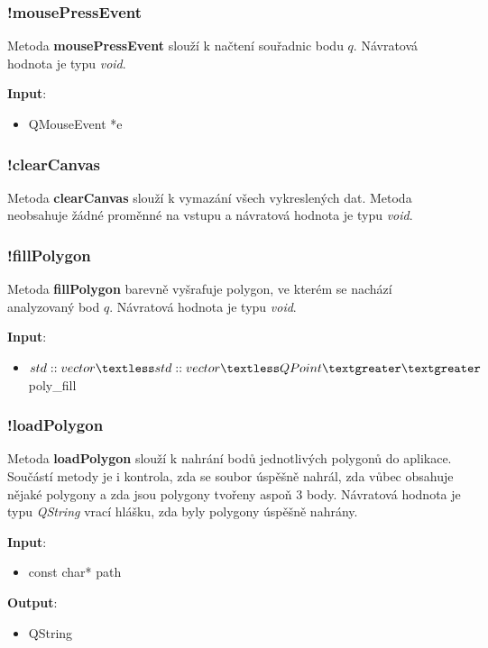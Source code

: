 \documentclass[a4paper, 12pt]{article}
\begin{document}
\subsubsection{!mousePressEvent}
Metoda \textbf{mousePressEvent} slouží k načtení souřadnic bodu $q$. Návratová hodnota je typu \textsl{void}.

\textbf{Input}:
\begin{itemize}
\item QMouseEvent *e
\end{itemize}

\subsubsection{!clearCanvas}
Metoda \textbf{clearCanvas} slouží k vymazání všech vykreslených dat. Metoda neobsahuje žádné proměnné na vstupu a návratová hodnota je typu \textsl{void}.

\subsubsection{!fillPolygon}
Metoda \textbf{fillPolygon} barevně vyšrafuje polygon, ve kterém se nachází analyzovaný bod $q$. Návratová hodnota je typu \textsl{void}.

\textbf{Input}:
\begin{itemize}
\item $std::vector\textless std::vector\textless QPoint\textgreater \textgreater$ poly\_fill
\end{itemize}

\subsubsection{!loadPolygon}
Metoda \textbf{loadPolygon} slouží k nahrání bodů jednotlivých polygonů do aplikace.  Součástí metody je i kontrola, zda se soubor úspěšně nahrál, zda vůbec obsahuje nějaké polygony a zda jsou polygony tvořeny aspoň 3 body. Návratová hodnota je typu \textsl{QString} vrací hlášku, zda byly polygony úspěšně nahrány.

\textbf{Input}:
\begin{itemize}
\item const char* path
\end{itemize}

\textbf{Output}:
\begin{itemize}
\item QString
\end{itemize}
\end{document}
